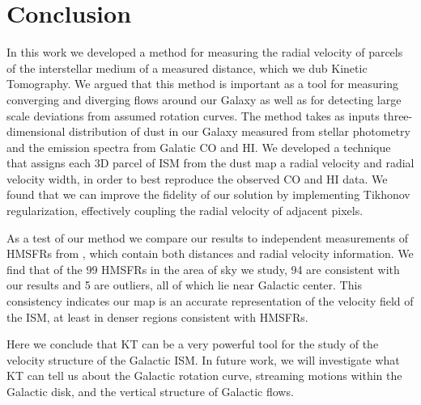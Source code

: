 \section{Conclusion}
\label{sec:conclusion}

In this work we developed a method for measuring the radial velocity of parcels of the interstellar medium of a measured distance, which we dub  Kinetic Tomography. We argued that this method is important as a tool for measuring converging and diverging flows around our Galaxy as well as for detecting large scale deviations from assumed rotation curves. The method takes as inputs three-dimensional distribution of dust in our Galaxy measured from stellar photometry and the emission spectra from Galatic CO and HI. We developed a technique that assigns each 3D parcel of ISM from the dust map a radial velocity and radial velocity width, in order to best reproduce the observed CO and HI data. We found that we can improve the fidelity of our solution by implementing Tikhonov regularization, effectively coupling the radial velocity of adjacent pixels. 

As a test of our method we compare our results to independent measurements of HMSFRs from \Reid{}, which contain both distances and radial velocity information. We find that of the 99 HMSFRs in the area of sky we study, 94 are consistent with our results and 5 are outliers, all of which lie near Galactic center. This consistency indicates our map is an accurate representation of the velocity field of the ISM, at least in denser regions consistent with HMSFRs. 

Here we conclude that KT can be a very powerful tool for the study of the velocity structure of the Galactic ISM. In future work, we will investigate what KT can tell us about the Galactic rotation curve, streaming motions within the Galactic disk, and the vertical structure of Galactic flows.


